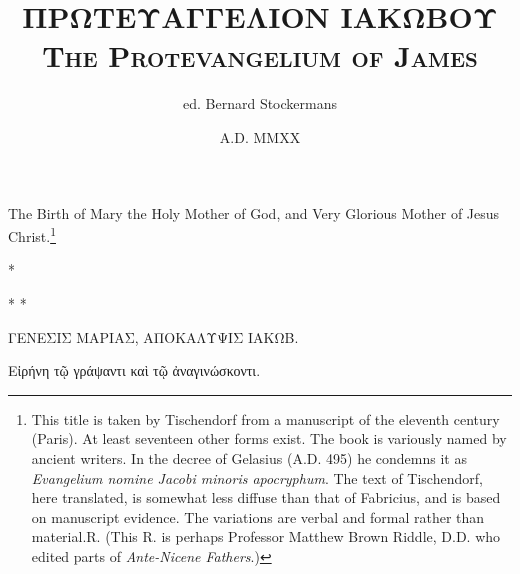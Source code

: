 \documentclass[10pt]{book}
\begin{document}
\sloppy

\title{\scshape{\greekfont ΠΡΩΤΕΥΑΓΓΕΛΙΟΝ ΙΑΚΩΒΟΥ}\\The Protevangelium of James}
\author{ed. Bernard Stockermans}
\date{A.D. MMXX}
\maketitle

\chapter*{}

{\center\Large
The Birth of Mary the Holy Mother of God, and Very Glorious Mother of Jesus Christ.\footnote{This title is taken by Tischendorf from a manuscript of the eleventh century (Paris). At least seventeen other forms exist. The book is variously named by ancient writers. In the decree of Gelasius (A.D. 495) he condemns it as \textit{Evangelium nomine Jacobi minoris apocryphum}. The text of Tischendorf, here translated, is somewhat less diffuse than that of Fabricius, and is based on manuscript evidence. The variations are verbal and formal rather than material.\textemdash R. (This R. is perhaps Professor Matthew Brown Riddle, D.D. who edited parts of \textit{Ante-Nicene Fathers}.)}}

\begin{pairs}
\begin{Leftside}
\beginnumbering
\numberpstarttrue

{\greekfont


}

\endnumbering
\end{Leftside}

\begin{Rightside}
\beginnumbering
\numberpstarttrue



\endnumbering
\end{Rightside}
\end{pairs}
\Columns

{\center
*

* *

{\Large\greekfont
ΓΕΝΕΣΙΣ ΜΑΡΙΑΣ, ΑΠΟΚΑΛΥΨΙΣ ΙΑΚΩΒ.

Εἰρήνη τῷ γράψαντι καὶ τῷ ἀναγινώσκοντι.

}
}
\end{document}
